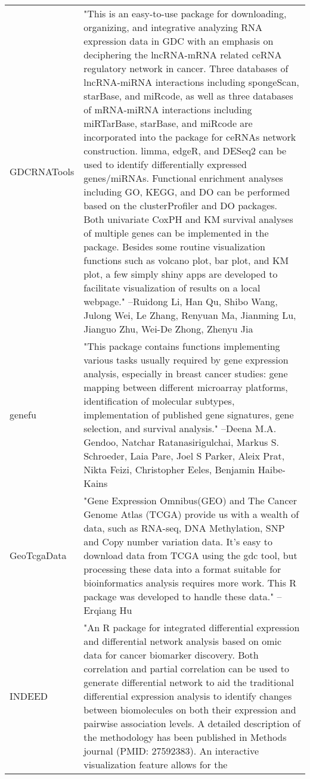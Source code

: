 \begin{longtable}[t]{l>{\raggedright\arraybackslash}p{25em}}
\addlinespace
GDCRNATools & "This is an easy-to-use package for downloading,
organizing, and integrative analyzing RNA expression data in
GDC with an emphasis on deciphering the lncRNA-mRNA related
ceRNA regulatory network in cancer. Three databases of
lncRNA-miRNA interactions including spongeScan, starBase, and
miRcode, as well as three databases of mRNA-miRNA interactions
including miRTarBase, starBase, and miRcode are incorporated
into the package for ceRNAs network construction. limma, edgeR,
and DESeq2 can be used to identify differentially expressed
genes/miRNAs. Functional enrichment analyses including GO,
KEGG, and DO can be performed based on the clusterProfiler and
DO packages. Both univariate CoxPH and KM survival analyses of
multiple genes can be implemented in the package. Besides some
routine visualization functions such as volcano plot, bar plot,
and KM plot, a few simply shiny apps are developed to
facilitate visualization of results on a local webpage." --Ruidong Li, Han Qu, Shibo Wang, Julong Wei, Le Zhang, Renyuan Ma, Jianming Lu, Jianguo Zhu, Wei-De Zhong, Zhenyu Jia\\
genefu & "This package contains functions implementing various tasks
usually required by gene expression analysis, especially in
breast cancer studies: gene mapping between different
microarray platforms, identification of molecular subtypes,
implementation of published gene signatures, gene selection,
and survival analysis." --Deena M.A. Gendoo, Natchar Ratanasirigulchai, Markus S. Schroeder, Laia Pare, Joel S Parker, Aleix Prat, Nikta Feizi, Christopher Eeles, Benjamin Haibe-Kains\\
GeoTcgaData & "Gene Expression Omnibus(GEO) and The Cancer Genome Atlas
(TCGA) provide us with a wealth of data, such as RNA-seq, DNA
Methylation, SNP and Copy number variation data. It's easy to
download data from TCGA using the gdc tool, but processing
these data into a format suitable for bioinformatics analysis
requires more work. This R package was developed to handle
these data." --Erqiang Hu\\
INDEED & "An R package for integrated differential expression and
differential network analysis based on omic data for cancer
biomarker discovery. Both correlation and partial correlation
can be used to generate differential network to aid the
traditional differential expression analysis to identify
changes between biomolecules on both their expression and
pairwise association levels. A detailed description of the
methodology has been published in Methods journal (PMID:
27592383). An interactive visualization feature allows for the

\end{longtable}
